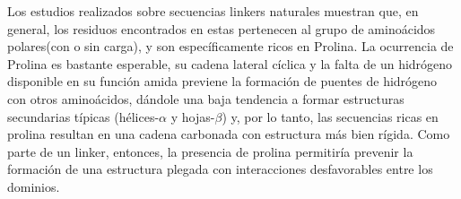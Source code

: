 

Los estudios realizados sobre secuencias linkers naturales \cite{argos1990investigation, george2002analysis, chen2013fusion} muestran que, en general, 
los residuos encontrados en estas pertenecen al grupo de aminoácidos polares(con o sin carga), y son específicamente ricos en Prolina. %
La ocurrencia de Prolina es bastante esperable, su cadena lateral cíclica y la falta de un hidrógeno disponible 
en su función amida previene la formación de puentes de hidrógeno con otros aminoácidos, dándole una baja 
tendencia a formar estructuras secundarias típicas (hélices-$\alpha$ y hojas-$\beta$) y, por lo tanto, las secuencias ricas en prolina resultan en una cadena carbonada con estructura 
más bien rígida. Como parte de un linker, entonces, la presencia de prolina permitiría prevenir la formación de una estructura plegada con interacciones desfavorables entre los dominios. 





